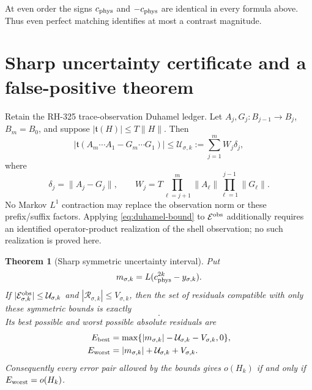 \documentclass[11pt]{article}
\newtheorem{theorem}{Theorem}[section]
\theoremstyle{remark}
\newcommand{\cE}{\mathcal E}
\newcommand{\cR}{\mathcal R}
\newcommand{\cU}{\mathcal U}
\begin{document}
At even order the signs $c_{\rm phys}$ and $-c_{\rm phys}$ are identical in
every formula above.  Thus even perfect matching identifies at most a
contrast magnitude.

\section{Sharp uncertainty certificate and a false-positive theorem}

Retain the RH-325 trace-observation Duhamel ledger.  Let
$A_j,G_j:B_{j-1}\to B_j$, $B_m=B_0$, and suppose
$|\mathfrak t(H)|\le T\lVert H\rVert$.  Then
\begin{equation}
 |\mathfrak t(A_m\cdots A_1-G_m\cdots G_1)|
 \le \cU_{\sigma,k}:=\sum_{j=1}^mW_j\delta_j,
 \label{eq:duhamel-bound}
\end{equation}
where
\begin{equation}
 \delta_j=\lVert A_j-G_j\rVert,
 \qquad
 W_j=T\prod_{\ell=j+1}^m\lVert A_\ell\rVert
       \prod_{\ell=1}^{j-1}\lVert G_\ell\rVert.
 \label{eq:duhamel-weights}
\end{equation}
No Markov $L^1$ contraction may replace the observation norm or these
prefix/suffix factors.  Applying \eqref{eq:duhamel-bound} to
$\cE^{\rm obs}$ additionally requires an identified operator-product
realization of the shell observation; no such realization is proved here.

\begin{theorem}[Sharp symmetric uncertainty interval]
\label{thm:uncertainty}
Put
\begin{equation}
 m_{\sigma,k}=L(c_{\rm phys}^{2k}-y_{\sigma,k}).
 \label{eq:model-mismatch}
\end{equation}
If
$|\cE_{\sigma,k}^{\rm obs}|\le\cU_{\sigma,k}$ and
$|\cR_{\sigma,k}|\le V_{\sigma,k}$, then the set of residuals compatible
with only these symmetric bounds is exactly
\begin{equation}
 [m_{\sigma,k}-\cU_{\sigma,k}-V_{\sigma,k},\,
  m_{\sigma,k}+\cU_{\sigma,k}+V_{\sigma,k}].
 \label{eq:uncertainty-interval}
\end{equation}
Its best possible and worst possible absolute residuals are
\begin{align}
 E_{\rm best}
 &=\max\{|m_{\sigma,k}|-\cU_{\sigma,k}-V_{\sigma,k},0\},
 \label{eq:best-residual}\\
 E_{\rm worst}
 &=|m_{\sigma,k}|+\cU_{\sigma,k}+V_{\sigma,k}.
 \label{eq:worst-residual}
\end{align}
Consequently every error pair allowed by the bounds gives $o(H_k)$ if and
only if $E_{\rm worst}=o(H_k)$.
\end{theorem}
\end{document}
